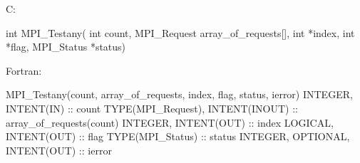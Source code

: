 C:

int MPI_Testany(
    int count, MPI_Request array_of_requests[],
    int *index, int *flag, MPI_Status *status)

Fortran:
    
MPI_Testany(count, array_of_requests, index, flag, status, ierror)
INTEGER, INTENT(IN) :: count
TYPE(MPI_Request), INTENT(INOUT) :: array_of_requests(count)
INTEGER, INTENT(OUT) :: index
LOGICAL, INTENT(OUT) :: flag
TYPE(MPI_Status) :: status
INTEGER, OPTIONAL, INTENT(OUT) :: ierror
